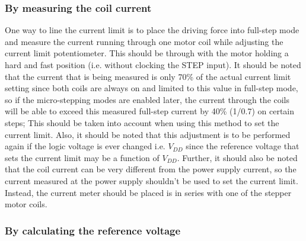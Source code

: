 \subsubsection*{By measuring the coil current}

One way to line the current limit is to place the driving force into full-step mode and measure the current running through one motor coil while adjusting the current limit potentiometer. This should be through with the motor holding a hard and fast position (i.e. without clocking the STEP input). It should be noted that the current that is being measured is only 70\% of the actual current limit setting since both coils are always on and limited to this value in full-step mode, so if the micro-stepping modes are enabled later, the current through the coils will be able to exceed this measured full-step current by 40\% (1/0.7) on certain steps; This should be taken into account when using this method to set the current limit. Also, it should be noted that this adjustment is to be performed again if the logic voltage is ever changed i.e. $V_{DD}$ since the reference voltage that sets the current limit may be a function of $V_{DD}$. Further, it should also be noted that the coil current can be very different from the power supply current, so the current measured at the power supply shouldn’t be used to set the current limit. Instead, the current meter should be placed is in series with one of the stepper motor coils.

\subsubsection*{By calculating the reference voltage}

